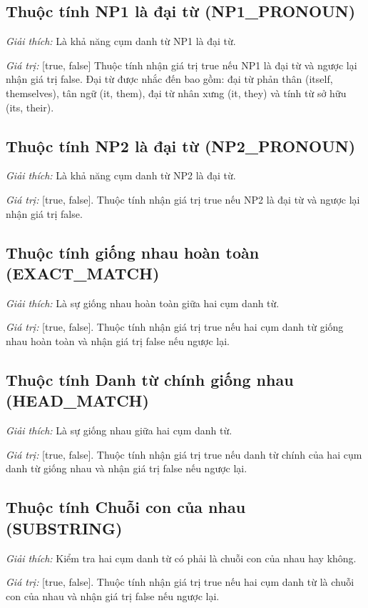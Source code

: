 \documentclass[12pt]{report}
\begin{document}
			\subsection*{Thuộc tính NP1 là đại từ (NP1\_PRONOUN)}
				\par \textit{Giải thích:} Là khả năng cụm danh từ NP1 là đại từ.
				\par \textit{Giá trị:} [true, false] Thuộc tính nhận giá trị true nếu NP1 là đại từ và ngược lại nhận giá trị false. Đại từ được nhắc đến bao gồm: đại từ phản thân (itself, themselves), tân ngữ (it, them), đại từ nhân xưng (it, they) và tính từ sở hữu (its, their).

			\subsection*{Thuộc tính NP2 là đại từ (NP2\_PRONOUN)}
				\par \textit{Giải thích:} Là khả năng cụm danh từ NP2 là đại từ.
				\par \textit{Giá trị:} [true, false]. Thuộc tính nhận giá trị true nếu NP2 là đại từ và ngược lại nhận giá trị false.

			\subsection*{Thuộc tính giống nhau hoàn toàn (EXACT\_MATCH)}
				\par \textit{Giải thích:} Là sự giống nhau hoàn toàn giữa hai cụm danh từ.
				\par \textit{Giá trị:} [true, false]. Thuộc tính nhận giá trị true nếu hai cụm danh từ giống nhau hoàn toàn và nhận giá trị false nếu ngược lại.

			\subsection*{Thuộc tính Danh từ chính giống nhau (HEAD\_MATCH)}
				\par \textit{Giải thích:} Là sự giống nhau giữa hai cụm danh từ.
				\par \textit{Giá trị:} [true, false]. Thuộc tính nhận giá trị true nếu danh từ chính của hai cụm danh từ giống nhau và nhận giá trị false nếu ngược lại.

			\subsection*{Thuộc tính Chuỗi con của nhau (SUBSTRING)}
				\par \textit{Giải thích:} Kiểm tra hai cụm danh từ có phải là chuỗi con của nhau hay không.
				\par \textit{Giá trị:} [true, false]. Thuộc tính nhận giá trị true nếu hai cụm danh từ là chuỗi con của nhau và nhận giá trị false nếu ngược lại.
\end{document}
